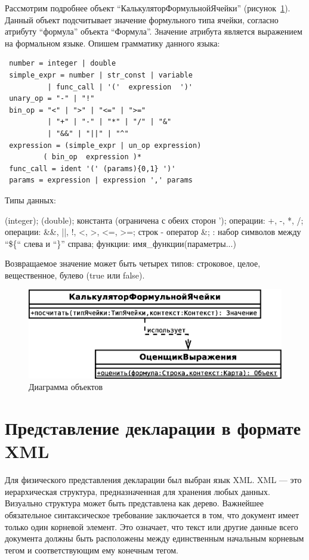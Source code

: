 \documentclass[14pt,a4paper]{reportmod}
\begin{document}
Рассмотрим подробнее объект ``КалькуляторФормульнойЯчейки'' (рисунок~\ref{pic:classes_4}). Данный объект подсчитывает значение формульного типа ячейки, согласно атрибуту ``формула'' объекта ``Формула''. Значение атрибута является выражением на формальном языке. Опишем грамматику данного языка:

\begin{verbatim}
 number = integer | double
 simple_expr = number | str_const | variable
          | func_call | '('  expression  ')'
 unary_op = "-" | "!"
 bin_op = "<" | ">" | "<=" | ">="
          | "+" | "-" | "*" | "/" | "&"
          | "&&" | "||" | "^"
 expression = (simple_expr | un_op expression)
         ( bin_op  expression )*
 func_call = ident '(' (params){0,1} ')'
 params = expression | expression ',' params
\end{verbatim}

Типы данных:
\begin{itemize}
  (integer);
  (double);
   константа (ограничена с обеих сторон ');
   операции: +, -, *, /;
   операции: \&\&, ||, !, <, >, <=, >=;
   строк - оператор \&;
  : набор символов между ``\$\{`` слева и ``\}'' справа;
   функции: имя\_функции(параметры...)
\end{itemize}

Возвращаемое значение может быть четырех типов: строковое, целое, вещественное, булево (true или false).

\begin{figure}
  \centering
  \includegraphics[scale=0.4]{uml/_classes_4}
  \caption{Диаграмма объектов}
  \label{pic:classes_4}
\end{figure}

\section{Представление декларации в формате XML}
Для физического представления декларации был выбран язык XML. XML — это иерархическая структура, предназначенная для хранения любых данных. Визуально структура может быть представлена как дерево. Важнейшее обязательное синтаксическое требование заключается в том, что документ имеет только один корневой элемент. Это означает, что текст или другие данные всего документа должны быть расположены между единственным начальным корневым тегом и соответствующим ему конечным тегом.
\end{document}

